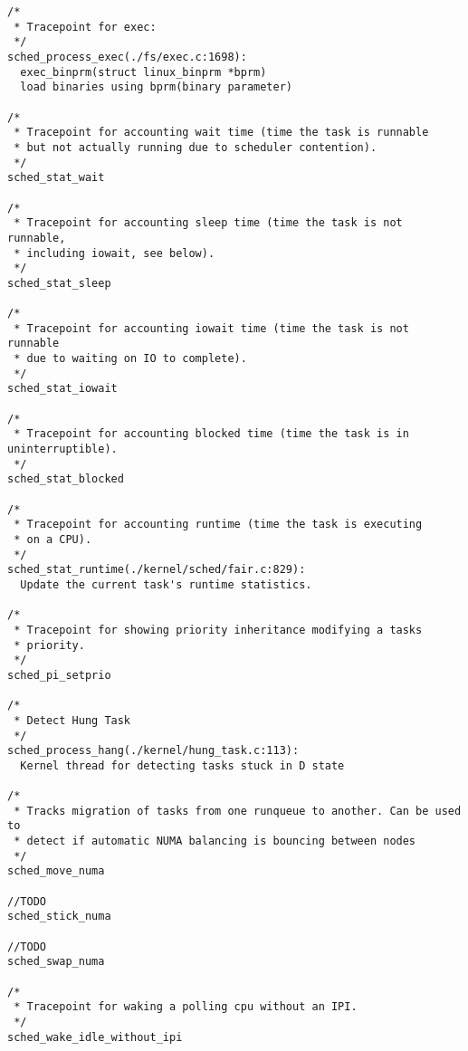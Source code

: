 \begin{Verbatim}
/*
 * Tracepoint for exec:
 */
sched_process_exec(./fs/exec.c:1698):
  exec_binprm(struct linux_binprm *bprm)
  load binaries using bprm(binary parameter)

/*
 * Tracepoint for accounting wait time (time the task is runnable
 * but not actually running due to scheduler contention).
 */
sched_stat_wait

/*
 * Tracepoint for accounting sleep time (time the task is not runnable,
 * including iowait, see below).
 */
sched_stat_sleep

/*
 * Tracepoint for accounting iowait time (time the task is not runnable
 * due to waiting on IO to complete).
 */
sched_stat_iowait

/*
 * Tracepoint for accounting blocked time (time the task is in uninterruptible).
 */
sched_stat_blocked

/*
 * Tracepoint for accounting runtime (time the task is executing
 * on a CPU).
 */
sched_stat_runtime(./kernel/sched/fair.c:829):
  Update the current task's runtime statistics.

/*
 * Tracepoint for showing priority inheritance modifying a tasks
 * priority.
 */
sched_pi_setprio

/*
 * Detect Hung Task
 */
sched_process_hang(./kernel/hung_task.c:113):
  Kernel thread for detecting tasks stuck in D state

/*
 * Tracks migration of tasks from one runqueue to another. Can be used to
 * detect if automatic NUMA balancing is bouncing between nodes
 */
sched_move_numa

//TODO
sched_stick_numa

//TODO
sched_swap_numa

/*
 * Tracepoint for waking a polling cpu without an IPI.
 */
sched_wake_idle_without_ipi
\end{Verbatim}